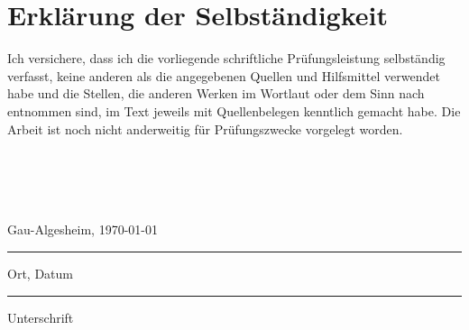 \section*{Erklärung der Selbständigkeit}
Ich versichere, dass ich die vorliegende schriftliche Prüfungsleistung selbständig verfasst, keine anderen als die angegebenen Quellen und Hilfsmittel verwendet habe und die Stellen, die anderen Werken im Wortlaut oder dem Sinn nach entnommen sind, im Text jeweils mit Quellenbelegen kenntlich gemacht habe. Die Arbeit ist noch nicht anderweitig für Prüfungszwecke vorgelegt worden.
\\
\\
\\
\\
\\

\parbox{5cm}{\centering  Gau-Algesheim, \today\hrule\strut\centering\footnotesize Ort, Datum}
\hfill
\vspace{-2cm}
\parbox{6cm}{ \hrule\strut \centering\footnotesize Unterschrift}
